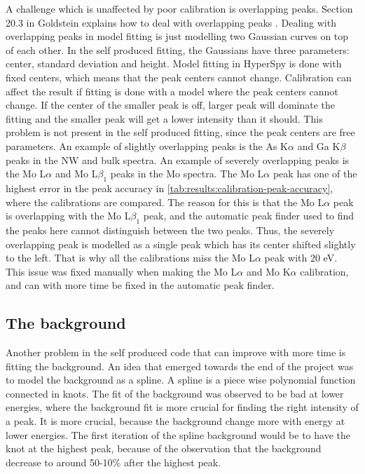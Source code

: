 A challenge which is unaffected by poor calibration is overlapping peaks.
Section 20.3 in Goldstein explains how to deal with overlapping peaks \cite{goldstein_scanning_2018}.
Dealing with overlapping peaks in model fitting is just modelling two Gaussian curves on top of each other.
In the self produced fitting, the Gaussians have three parameters: center, standard deviation and height.
Model fitting in HyperSpy is done with fixed centers, which means that the peak centers cannot change.
Calibration can affect the result if fitting is done with a model where the peak centers cannot change.
If the center of the smaller peak is off, larger peak will dominate the fitting and the smaller peak will get a lower intensity than it should.
This problem is not present in the self produced fitting, since the peak centers are free parameters.
An example of slightly overlapping peaks is the As K$\alpha$ and Ga K$\beta$ peaks in the NW and bulk spectra.
An example of severely overlapping peaks is the Mo L$\alpha$ and Mo L$\beta_1$ peaks in the Mo spectra.
The Mo L$\alpha$ peak has one of the highest error in the peak accuracy in \cref{tab:results:calibration-peak-accuracy}, where the calibrations are compared. The reason for this is that the Mo L$\alpha$ peak is overlapping with the Mo L$\beta_1$ peak, and the automatic peak finder used to find the peaks here cannot distinguish between the two peaks.
Thus, the severely overlapping peak is modelled as a single peak which has its center shifted slightly to the left.
That is why all the calibrations miss the Mo L$\alpha$ peak with 20 eV.
This issue was fixed manually when making the Mo L$\alpha$ and Mo K$\alpha$ calibration, and can with more time be fixed in the automatic peak finder.




























\subsection{The background}
\label{sec:discussion:general:background}
Another problem in the self produced code that can improve with more time is fitting the background.
An idea that emerged towards the end of the project was to model the background as a spline.
A spline is a piece wise polynomial function connected in knots.
The fit of the background was observed to be bad at lower energies, where the background fit is more crucial for finding the right intensity of a peak.
It is more crucial, because the background change more with energy at lower energies.
The first iteration of the spline background would be to have the knot at the highest peak, because of the observation that the background decrease to around 50-10\% after the highest peak.


